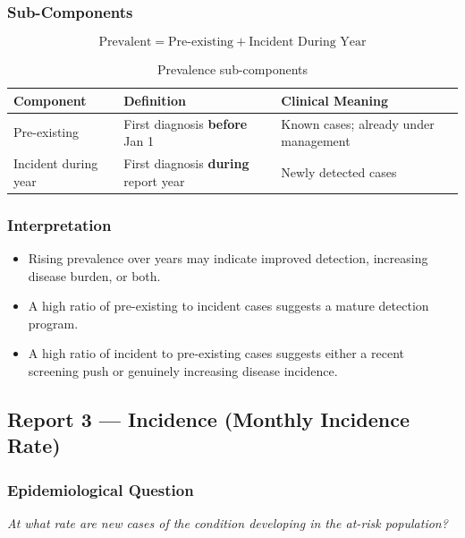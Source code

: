 \documentclass[11pt,a4paper]{article}
\begin{document}
\subsubsection{Sub-Components}

\begin{equation}
\text{Prevalent} = \text{Pre-existing} + \text{Incident During Year}
\end{equation}

\begin{table}[ht]
\centering
\caption{Prevalence sub-components}
\begin{tabular}{@{}lll@{}}
\toprule
\textbf{Component} & \textbf{Definition} & \textbf{Clinical Meaning} \\
\midrule
Pre-existing & First diagnosis \textbf{before} Jan 1 & Known cases; already under management \\
Incident during year & First diagnosis \textbf{during} report year & Newly detected cases \\
\bottomrule
\end{tabular}
\end{table}

\subsubsection{Interpretation}

\begin{itemize}[leftmargin=*]
    \item Rising prevalence over years may indicate improved detection, increasing disease burden, or both.
    \item A high ratio of pre-existing to incident cases suggests a mature detection program.
    \item A high ratio of incident to pre-existing cases suggests either a recent screening push or genuinely increasing disease incidence.
\end{itemize}

\subsection{Report 3 --- Incidence (Monthly Incidence Rate)}

\subsubsection{Epidemiological Question}
\textit{At what rate are new cases of the condition developing in the at-risk population?}
\end{document}
